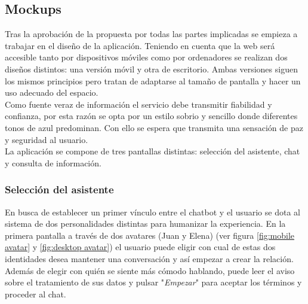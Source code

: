 
\subsection{Mockups}
Tras la aprobación de la propuesta por todas las partes implicadas se empieza a trabajar en el diseño de la aplicación. Teniendo en cuenta que la web será accesible tanto por dispositivos móviles como por ordenadores se realizan dos diseños distintos: una versión móvil y otra de escritorio. Ambas versiones siguen los mismos principios pero tratan de adaptarse al tamaño de pantalla y hacer un uso adecuado del espacio.\\

Como fuente veraz de información el servicio debe transmitir fiabilidad y confianza, por esta razón se opta por un estilo sobrio y sencillo donde diferentes tonos de azul predominan. Con ello se espera que transmita una sensación de paz y seguridad al usuario.\\

La aplicación se compone de tres pantallas distintas: selección del asistente, chat y consulta de información.\\

\subsubsection{Selección del asistente}
En busca de establecer un primer vínculo entre el chatbot y el usuario se dota al sistema de dos personalidades distintas para humanizar la experiencia. En la primera pantalla a través de dos avatares (Juan y Elena) (ver figura \ref{fig:mobile avatar} y \ref{fig:desktop avatar}) el usuario puede eligir con cual de estas dos identidades desea mantener una conversación y así empezar a crear la relación. Además de elegir con quién se siente más cómodo hablando, puede leer el aviso sobre el tratamiento de sus datos y pulsar "\textit{Empezar}" para aceptar los términos y proceder al chat.\\

